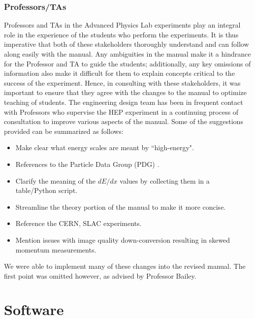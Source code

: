 \documentclass[12pt]{article} %
\begin{document}
\subsubsection{Professors/TAs}\label{Stakeholders_manual_TA/Prof}
Professors and TAs in the Advanced Physics Lab experiments play an integral role in the experience of the students who perform the experiments. It is thus imperative that both of these stakeholders thoroughly understand and can follow along easily with the manual. Any ambiguities in the manual make it a hindrance for the Professor and TA to guide the students; additionally, any key omissions of information also make it difficult for them to explain concepts critical to the success of the experiment. Hence, in consulting with these stakeholders, it was important to ensure that they agree with the changes to the manual to optimize teaching of students. The engineering design team has been in frequent contact with Professors who supervise the HEP experiment in a continuing process of consultation to improve various aspects of the manual. Some of the suggestions provided can be summarized as follows:

\begin{itemize}
    \item Make clear what energy scales are meant by ``high-energy".
    \item References to the Particle Data Group (PDG) \cite{PDG}.
    \item Clarify the meaning of the $dE/dx$ values by collecting them in a table/Python script.
    \item Streamline the theory portion of the manual to make it more concise.
    \item Reference the CERN, SLAC experiments.
    \item Mention issues with image quality down-conversion resulting in skewed momentum measurements.
\end{itemize}

We were able to implement many of these changes into the revised manual. The first point was omitted however, as advised by Professor Bailey. 


\newpage \section{Software}
\end{document}
